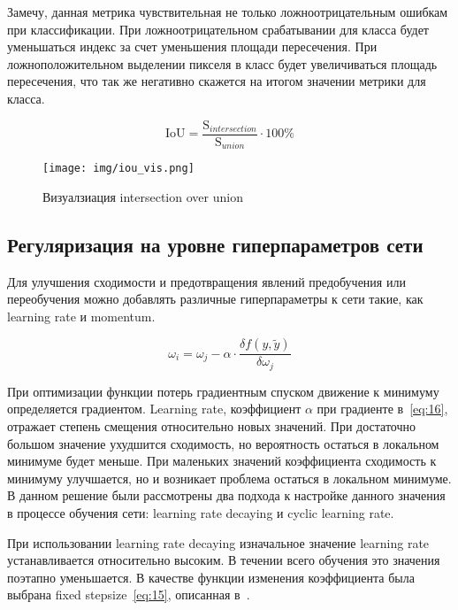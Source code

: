 Замечу, данная метрика чувствительная не только ложноотрицательным ошибкам при классификации.
При ложноотрицательном срабатывании для класса будет уменьшаться индекс за счет уменьшения площади пересечения.
При ложноположительном выделении пикселя в класс будет увеличиваться площадь пересечения, что так же негативно скажется на итогом значении метрики для класса.

\begin{equation}
    \label{eq:18}
    \mathrm{IoU} = \frac{\mathrm{S}_{intersection}}{\mathrm{S}_{union}} \cdot 100 \%
\end{equation}

\begin{figure}[H]
    \centering
    \texttt{[image: img/iou\_vis.png]}
    \caption{Визуалзиация intersection over union}
    \label{fig:iou_vis}
\end{figure}

\subsection{Регуляризация на уровне гиперпараметров сети}

Для улучшения сходимости и предотвращения явлений предобучения или переобучения можно добавлять различные гиперпараметры к сети такие, как learning rate и momentum.

\begin{equation}
    \label{eq:16}
    \omega_{i} = \omega_{j} - \alpha \cdot \frac{\delta f(y, \tilde{y})}{\delta\omega_{j}}
\end{equation}

При оптимизации функции потерь градиентным спуском движение к минимуму определяется градиентом.
Learning rate, коэффициент $\alpha$ при градиенте в~\eqref{eq:16}, отражает степень смещения относительно новых значений.
При достаточно большом значение ухудшится сходимость, но вероятность остаться в локальном минимуме будет меньше.
При маленьких значений коэффициента сходимость к минимуму улучшается, но и возникает проблема остаться в локальном минимуме.
В данном решение были рассмотрены два подхода к настройке данного значения в процессе обучения сети: learning rate decaying и cyclic learning rate.

При использовании learning rate decaying изначальное значение learning rate устанавливается относительно высоким.
В течении всего обучения это значения поэтапно уменьшается.
В качестве функции изменения коэффициента была выбрана fixed stepsize~\eqref{eq:15}, описанная в~\autocite{wu2019demystifying}.

